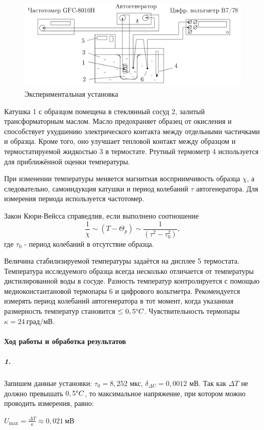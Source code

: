 \documentclass[a4paper,12pt]{article}
\begin{document}
\begin{figure}[!h]
\centering
\includegraphics[width=0.9\linewidth]{установка.png}
\caption{Экспериментальная установка}
\label{fig:mpr}
\end{figure}

Катушка 1 с образцом помещена в стеклянный сосуд 2, залитый трансформаторным маслом. Масло предохраняет образец от окисления и способствует ухудшению электрического контакта между отдельными частичками и образца. Кроме того, оно улучшает тепловой контакт между образцом и термостатируемой жидкостью 3 в термостате. Ртутный термометр 4 используется для приближённой оценки температуры.\par
При изменении температуры меняется магнитная восприимчивость образца $\chi$, а следовательно, самоиндукция катушки и период колебаний $\tau$ автогенератора. Для измерения периода используется частотомер.\par
Закон Кюри-Вейсса справедлив, если выполнено соотношение 
\begin{equation}
    \frac{1}{\chi} \sim (T - \Theta_{p}) \sim \frac{1}{(\tau^2 - \tau_{0}^{2})},
\end{equation}
где $\tau_{0}$ - период колебаний в отсутствие образца.\par 
Величина стабилизируемой температуры задаётся на дисплее 5 термостата. Температура исследуемого образца всегда несколько отличается от температуры дистилированной воды в сосуде. Разность температур контролируется с помощью медноконстантановой термопары 6 и цифрового вольтметра. Рекомендуется измерять период колебаний автогенератора в тот момент, когда указанная размерность температур становится $\leq 0,5 \degree C$. Чувствительность термопары $\kappa = 24~ град/мВ$.
\paragraph{Ход работы и обработка результатов}
\subparagraph{1.} Запишем данные установки: $\tau_{0} = 8,252$ мкс, $\delta_{\Delta U} = 0,0012$ мВ.
Так как $\Delta T$ не должно превышать $0,5\degree C$, то максимальное напряжение, при котором можно проводить измерения, равно:
\begin{center}
    $U_{\text{max}}= \frac{\Delta T}{\kappa}\approx 0,021~мВ $ 
\end{center}
\end{document}
